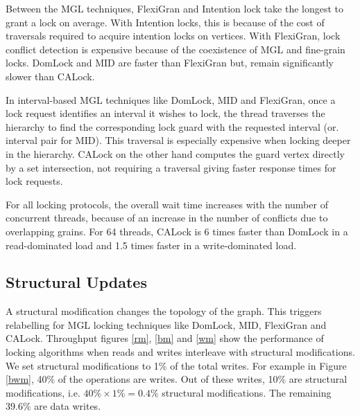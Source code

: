 Between the MGL techniques, FlexiGran and Intention lock take the longest to grant a lock on average. With Intention locks, this is because of the cost of traversals required to acquire intention locks on vertices. With FlexiGran, lock conflict detection is expensive because of the coexistence of MGL and fine-grain locks. DomLock and MID are faster than FlexiGran but, remain significantly slower than CALock. 

In interval-based MGL techniques like DomLock, MID and FlexiGran, once a lock request identifies an interval it wishes to lock, the thread traverses the hierarchy to find the corresponding lock guard with the requested interval (or. interval pair for MID). This traversal is especially expensive when locking deeper in the hierarchy. CALock on the other hand computes the guard vertex directly by a set intersection, not requiring a traversal giving faster response times for lock requests. 

For all locking protocols, the overall wait time increases with the number of concurrent threads, because of an increase in the number of conflicts due to overlapping grains. For 64 threads, CALock is 6 times faster than DomLock in a read-dominated load and 1.5 times faster in a write-dominated load.







	



\subsection{Structural Updates} \label{benchmark:DynamicOverallPerf}

A structural modification changes the topology of the graph. This triggers relabelling for MGL locking techniques like DomLock, MID, FlexiGran and CALock. 
Throughput figures \ref{rm}, \ref{bm} and \ref{wm} show the performance of locking algorithms when reads and writes interleave with structural modifications.
We set structural modifications to 1\% of the total writes.
For example in Figure \ref{bwm}, 40\% of the operations are writes. Out of these writes, 10\% are structural modifications, i.e. $40\% \times 1\%  = 0.4\%$ structural modifications. The remaining 39.6\% are data writes.


